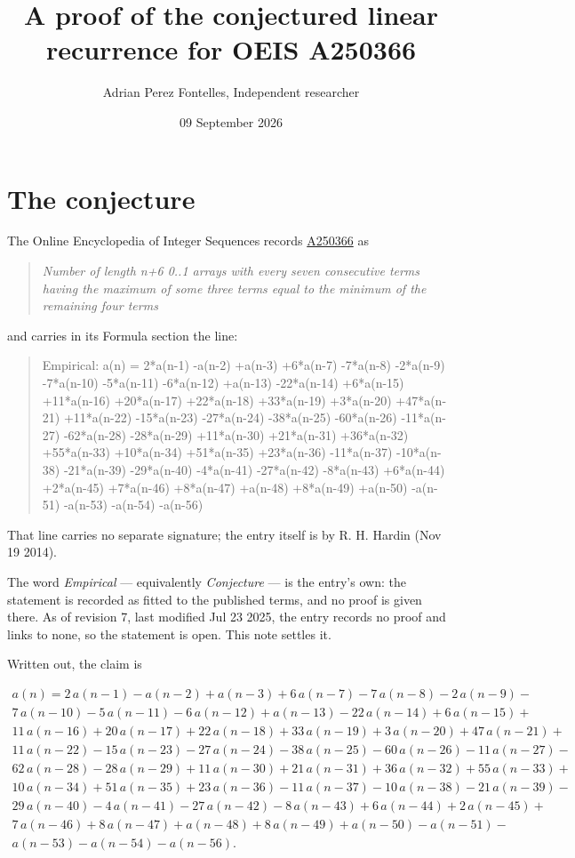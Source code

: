 \documentclass[11pt]{article}
\title{A proof of the conjectured linear recurrence for OEIS A250366}
\author{Adrian Perez Fontelles, Independent researcher}
\date{09 September 2026}
\theoremstyle{definition}
\begin{document}
\maketitle
\section{The conjecture}

The Online Encyclopedia of Integer Sequences records \href{https://oeis.org/A250366}{A250366} as

\begin{quote}\itshape Number of length n+6 0..1 arrays with every seven consecutive terms having the maximum of some three terms equal to the minimum of the remaining four terms\end{quote}

and carries in its Formula section the line:

\begin{quote}\ttfamily Empirical: a(n) = 2*a(n-1) -a(n-2) +a(n-3) +6*a(n-7) -7*a(n-8) -2*a(n-9) -7*a(n-10) -5*a(n-11) -6*a(n-12) +a(n-13) -22*a(n-14) +6*a(n-15) +11*a(n-16) +20*a(n-17) +22*a(n-18) +33*a(n-19) +3*a(n-20) +47*a(n-21) +11*a(n-22) -15*a(n-23) -27*a(n-24) -38*a(n-25) -60*a(n-26) -11*a(n-27) -62*a(n-28) -28*a(n-29) +11*a(n-30) +21*a(n-31) +36*a(n-32) +55*a(n-33) +10*a(n-34) +51*a(n-35) +23*a(n-36) -11*a(n-37) -10*a(n-38) -21*a(n-39) -29*a(n-40) -4*a(n-41) -27*a(n-42) -8*a(n-43) +6*a(n-44) +2*a(n-45) +7*a(n-46) +8*a(n-47) +a(n-48) +8*a(n-49) +a(n-50) -a(n-51) -a(n-53) -a(n-54) -a(n-56)\end{quote}

That line carries no separate signature; the entry itself is by R. H. Hardin (Nov 19 2014).

The word {\itshape Empirical} --- equivalently {\itshape Conjecture} --- is the entry's own: the statement is recorded as fitted to the published terms, and no proof is given there. As of revision 7, last modified Jul 23 2025, the entry records no proof and links to none, so the statement is open. This note settles it.

Written out, the claim is

\begin{multline*} a(n) = 2\,a(n-1) - a(n-2) + a(n-3) + 6\,a(n-7) - 7\,a(n-8) - 2\,a(n-9) - \\ 7\,a(n-10) - 5\,a(n-11) - 6\,a(n-12) + a(n-13) - 22\,a(n-14) + 6\,a(n-15) + \\ 11\,a(n-16) + 20\,a(n-17) + 22\,a(n-18) + 33\,a(n-19) + 3\,a(n-20) + 47\,a(n-21) + \\ 11\,a(n-22) - 15\,a(n-23) - 27\,a(n-24) - 38\,a(n-25) - 60\,a(n-26) - 11\,a(n-27) - \\ 62\,a(n-28) - 28\,a(n-29) + 11\,a(n-30) + 21\,a(n-31) + 36\,a(n-32) + 55\,a(n-33) + \\ 10\,a(n-34) + 51\,a(n-35) + 23\,a(n-36) - 11\,a(n-37) - 10\,a(n-38) - 21\,a(n-39) - \\ 29\,a(n-40) - 4\,a(n-41) - 27\,a(n-42) - 8\,a(n-43) + 6\,a(n-44) + 2\,a(n-45) + \\ 7\,a(n-46) + 8\,a(n-47) + a(n-48) + 8\,a(n-49) + a(n-50) - a(n-51) - \\ a(n-53) - a(n-54) - a(n-56). \end{multline*}
\end{document}
